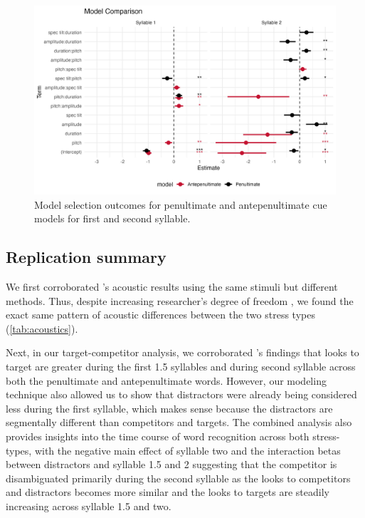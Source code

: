 \begin{figure}[H]
  \centering
  \includegraphics[width=1\linewidth]{visuals/analysis_3_plot.jpeg} %
  \caption{Model selection outcomes for penultimate and antepenultimate cue models for first and second syllable.}
  \label{fig:analysis_3_plot }
\end{figure}

\subsection{Replication summary}
We first corroborated \cite{Sulpizio_McQueen_2012}'s acoustic results using the same stimuli but different methods. Thus, despite increasing researcher's degree of freedom \citep{Corretta2023}, we found the exact same pattern of acoustic differences between the two stress types (\ref{tab:acoustics}).

Next, in our target-competitor analysis, we corroborated \cite{Sulpizio_McQueen_2012}'s findings that looks to target are greater during the first 1.5 syllables and during second syllable across both the penultimate and antepenultimate words. However, our modeling technique also allowed us to show that distractors were already being considered less during the first syllable, which makes sense because the distractors are segmentally different than competitors and targets. The combined analysis also provides insights into the time course of word recognition across both stress-types, with the negative main effect of syllable two and the interaction betas between distractors and syllable 1.5 and 2 suggesting that the competitor is disambiguated primarily during the second syllable as the looks to competitors and distractors becomes more similar and the looks to targets are steadily increasing across syllable 1.5 and two.

